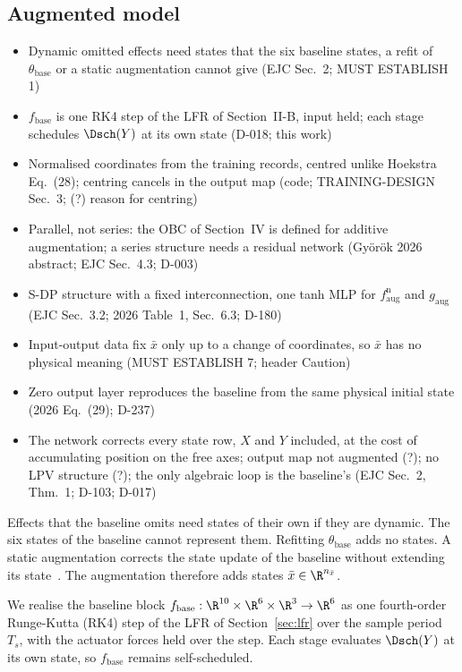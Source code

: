 \subsection{Augmented model}\label{sec:aug_structure}
\ifdraft
\begin{itemize}
\item Dynamic omitted effects need states that the six baseline states, a refit of $\theta_{\mathrm{base}}$ or a static augmentation cannot give (EJC Sec.~2; MUST ESTABLISH 1)
\item $f_{\mathrm{base}}$ is one RK4 step of the LFR of Section~II-B, input held; each stage schedules $\Dsch(Y)$ at its own state (D-018; this work)
\item Normalised coordinates from the training records, centred unlike Hoekstra Eq.~(28); centring cancels in the output map (code; TRAINING-DESIGN Sec.~3; (?) reason for centring)
\item Parallel, not series: the OBC of Section~IV is defined for additive augmentation; a series structure needs a residual network (Gy\"or\"ok 2026 abstract; EJC Sec.~4.3; D-003)
\item S-DP structure with a fixed interconnection, one tanh MLP for $f^{\mathrm n}_{\mathrm{aug}}$ and $g_{\mathrm{aug}}$ (EJC Sec.~3.2; 2026 Table~1, Sec.~6.3; D-180)
\item Input-output data fix $\bar x$ only up to a change of coordinates, so $\bar x$ has no physical meaning (MUST ESTABLISH 7; header Caution)
\item Zero output layer reproduces the baseline from the same physical initial state (2026 Eq.~(29); D-237)
\item The network corrects every state row, $X$ and $Y$ included, at the cost of accumulating position on the free axes; output map not augmented (?); no LPV structure (?); the only algebraic loop is the baseline's (EJC Sec.~2, Thm.~1; D-103; D-017)
\end{itemize}
\fi

Effects that the baseline omits need states of their own if they are
dynamic.
The six states of the baseline cannot represent them.
Refitting $\theta_{\mathrm{base}}$ adds no states.
A static augmentation corrects the state update of the baseline without
extending its state~\cite[Sec.~2]{hoekstra2025lfr}.
The augmentation therefore adds states $\bar x\in\R^{n_{\bar x}}$.

We realise the baseline block
$f_{\mathrm{base}}:\R^{10}\times\R^6\times\R^3\to\R^6$ as one fourth-order
Runge-Kutta (RK4) step of the LFR of Section~\ref{sec:lfr}
over the sample period $T_s$, with the actuator forces held over the step.
Each stage evaluates $\Dsch(Y)$ at its own state, so $f_{\mathrm{base}}$
remains self-scheduled.

